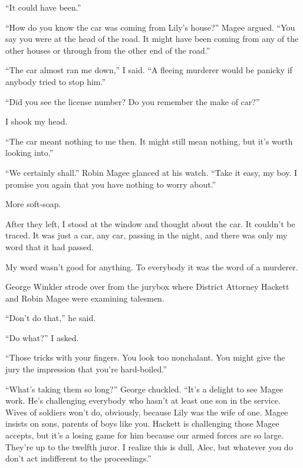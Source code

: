 \documentclass{novel}
\begin{document}
“It could have been.”

“How do you know the car was coming from Lily’s house?” Magee argued. “You say you were at the head of the road. It might have been coming from any of the other houses or through from the other end of the road.”

“The car almost ran me down,” I said. “A fleeing murderer would be panicky if anybody tried to stop him.”

“Did you see the license number? Do you remember the make of car?”

I shook my head.

“The car meant nothing to me then. It might still mean nothing, but it’s worth looking into.”

“We certainly shall.” Robin Magee glanced at his watch. “Take it easy, my boy. I promise you again that you have nothing to worry about.”

More soft-soap. 

After they left, I stood at the window and thought about the car. It couldn’t be traced. It was just a car, any car, passing in the night, and there was only my word that it had passed.

My word wasn’t good for anything. To everybody it was the word of a murderer.

\vspace{1\nbs}
\clearpage
\thispagestyle{empty}
\begin{ChapterStart}
\vspace{3\nbs}
\end{ChapterStart}

George Winkler strode over from the jurybox where District Attorney Hackett and Robin Magee were examining talesmen.

“Don’t do that,” he said.

“Do what?” I asked.

“Those tricks with your fingers. You look too nonchalant. You might give the jury the impression that you’re hard-boiled.”

“What’s taking them so long?” George chuckled. “It’s a delight to see Magee work. He’s challenging everybody who hasn’t at least one son in the service. Wives of soldiers won’t do, obviously, because Lily was the wife of one. Magee insists on sons, parents of boys like you. Hackett is challenging those Magee accepts, but it’s a losing game for him because our armed forces are so large. They’re up to the twelfth juror. I realize this is dull, Alec, but whatever you do don’t act indifferent to the proceedings.”
\end{document}
